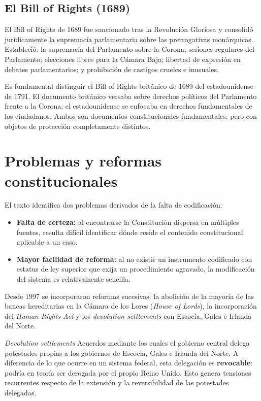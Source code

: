 \documentclass[12pt,oneside]{book}
\begin{document}
\subsection{El Bill of Rights (1689)}

El Bill of Rights de 1689 fue sancionado tras la Revolución Gloriosa y consolidó jurídicamente la supremacía parlamentaria sobre las prerrogativas monárquicas. Estableció: la supremacía del Parlamento sobre la Corona; sesiones regulares del Parlamento; elecciones libres para la Cámara Baja; libertad de expresión en debates parlamentarios; y prohibición de castigos crueles e inusuales.

\begin{important}
Es fundamental distinguir el Bill of Rights británico de 1689 del estadounidense de 1791. El documento británico versaba sobre derechos políticos del Parlamento frente a la Corona; el estadounidense se enfocaba en derechos fundamentales de los ciudadanos. Ambos son documentos constitucionales fundamentales, pero con objetos de protección completamente distintos.
\end{important}

\section{Problemas y reformas constitucionales}

El texto identifica dos problemas derivados de la falta de codificación:

\begin{itemize}
    \item \textbf{Falta de certeza:} al encontrarse la Constitución dispersa en múltiples fuentes, resulta difícil identificar dónde reside el contenido constitucional aplicable a un caso.
    \item \textbf{Mayor facilidad de reforma:} al no existir un instrumento codificado con estatus de ley superior que exija un procedimiento agravado, la modificación del sistema es relativamente sencilla.
\end{itemize}

Desde 1997 se incorporaron reformas sucesivas: la abolición de la mayoría de las bancas hereditarias en la Cámara de los Lores (\textit{House of Lords}), la incorporación del \textit{Human Rights Act} y los \textit{devolution settlements} con Escocia, Gales e Irlanda del Norte.

\begin{definition}{\textit{Devolution settlements}}
Acuerdos mediante los cuales el gobierno central delega potestades propias a los gobiernos de Escocia, Gales e Irlanda del Norte. A diferencia de lo que ocurre en un sistema federal, esta delegación es \textbf{revocable}: podría en teoría ser derogada por el propio Reino Unido. Esto genera tensiones recurrentes respecto de la extensión y la reversibilidad de las potestades delegadas.
\end{definition}
\end{document}
